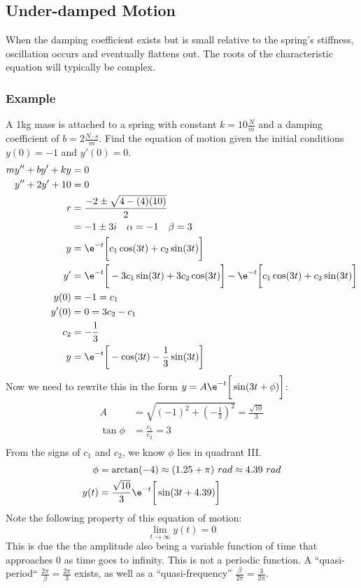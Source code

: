 \documentclass{math}
\begin{document}
\subsection*{Under-damped Motion}
When the damping coefficient exists but is small relative to the spring's
stiffness, oscillation occurs and eventually flattens out. The roots of the
characteristic equation will typically be complex.

\subsubsection*{Example}
A 1kg mass is attached to a spring with constant \( k = 10\frac{N}{m} \) and a
damping coefficient of \( b = 2\frac{N\cdot s}{m} \). Find the equation of
motion given the initial conditions \( y(0) = -1 \) and \( y'(0) = 0 \).
\begin{align*}
  my''+by'+ky &= 0 \\
  y''+2y'+10 &= 0 \\
  r &= \frac{-2\pm\sqrt{4-(4)(10)}}{2} \\
  &= -1\pm3i \quad \alpha = -1 \quad \beta = 3 \\
  y &= \e^{-t}\bigg[c_1\cos(3t)+c_2\sin(3t)\bigg] \\
  y' &= \e^{-t}\bigg[-3c_1\sin(3t)+3c_2\cos(3t)\bigg]-
    \e^{-t}\bigg[c_1\cos(3t)+c_2\sin(3t)\bigg] \\
  y(0) &= -1 = c_1 \\
  y'(0) &= 0 = 3c_2-c_1 \\
  c_2 &= -\frac{1}{3} \\
  y &= \e^{-t}\bigg[-\cos(3t)-\frac{1}{3}\sin(3t)\bigg]
\end{align*}
Now we need to rewrite this in the form \( y =
A\e^{-t}\bigg[\sin(3t+\phi)\bigg] \):
\begin{align*}
  A &= \sqrt{(-1)^2+(-\frac{1}{3})^2} = \frac{\sqrt{10}}{3} \\
  \tan\phi &= \frac{c_1}{c_2} = 3 \\
\end{align*}
From the signs of \( c_1 \) and \( c_2 \), we know \( \phi \) lies in quadrant
III.
\begin{align*}
  \phi &= \arctan(-4) \approx (1.25+\pi)~rad \approx 4.39~rad \\
  y(t) &= \frac{\sqrt{10}}{3}\e^{-t}\bigg[\sin(3t+4.39)\bigg]
\end{align*}
Note the following property of this equation of motion:
\[ \lim_{t\to\infty}y(t) = 0 \]
This is due the the amplitude also being a variable function of time that
approaches 0 as time goes to infinity. This is not a periodic function. A
``quasi-period`` \( \frac{2\pi}{\beta} = \frac{2\pi}{3} \) exists, as well
as a ``quasi-frequency'' \( \frac{\beta}{2\pi} = \frac{3}{2\pi} \).
\end{document}
